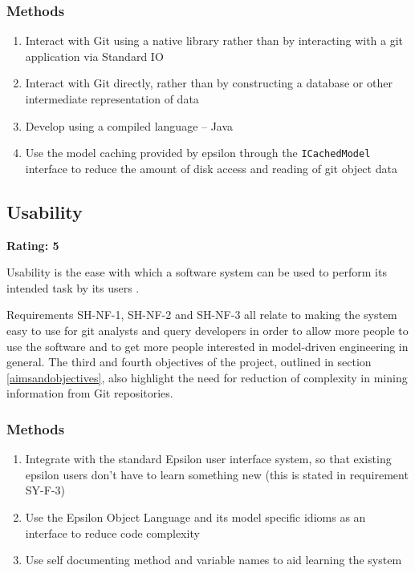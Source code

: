 \documentclass[11pt]{book}
\newcommand{\code}[1]{\texttt{#1}}
\begin{document}
\subsubsection{Methods}
\begin{enumerate}
	\item Interact with Git using a native library rather than by interacting with a git application via Standard IO
	\item Interact with Git directly, rather than by constructing a database or other intermediate representation of data
	\item Develop using a compiled language -- Java
	\item Use the model caching provided by epsilon through the \code{ICachedModel} interface to reduce the amount of disk access and reading of git object data
\end{enumerate}


\subsection{Usability}
\textbf{Rating: 5}

Usability is the ease with which a software system can be used to perform its intended task by its users \cite{usabilitydefinition}. 

Requirements SH-NF-1, SH-NF-2 and SH-NF-3 all relate to making the system easy to use for git analysts and query developers in order to allow more people to use the software and to get more people interested in model-driven engineering in general. The third and fourth objectives of the project, outlined in section \ref{aimsandobjectives}, also highlight the need for reduction of complexity in mining information from Git repositories.

\subsubsection{Methods}
\begin{enumerate}
	\item Integrate with the standard Epsilon user interface system, so that existing epsilon users don't have to learn something new (this is stated in requirement SY-F-3)
	\item Use the Epsilon Object Language and its model specific idioms as an interface to reduce code complexity
	\item Use self documenting method and variable names to aid learning the system
\end{enumerate}
\end{document}
